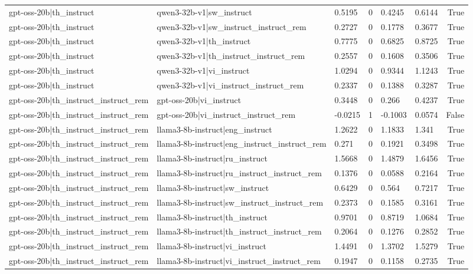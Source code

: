 \begin{table}
\begin{tabular}{llllllr}
gpt-oss-20b|th_instruct & qwen3-32b-v1|sw_instruct & 0.5195 & 0 & 0.4245 & 0.6144 & True \\
gpt-oss-20b|th_instruct & qwen3-32b-v1|sw_instruct_instruct_rem & 0.2727 & 0 & 0.1778 & 0.3677 & True \\
gpt-oss-20b|th_instruct & qwen3-32b-v1|th_instruct & 0.7775 & 0 & 0.6825 & 0.8725 & True \\
gpt-oss-20b|th_instruct & qwen3-32b-v1|th_instruct_instruct_rem & 0.2557 & 0 & 0.1608 & 0.3506 & True \\
gpt-oss-20b|th_instruct & qwen3-32b-v1|vi_instruct & 1.0294 & 0 & 0.9344 & 1.1243 & True \\
gpt-oss-20b|th_instruct & qwen3-32b-v1|vi_instruct_instruct_rem & 0.2337 & 0 & 0.1388 & 0.3287 & True \\
gpt-oss-20b|th_instruct_instruct_rem & gpt-oss-20b|vi_instruct & 0.3448 & 0 & 0.266 & 0.4237 & True \\
gpt-oss-20b|th_instruct_instruct_rem & gpt-oss-20b|vi_instruct_instruct_rem & -0.0215 & 1 & -0.1003 & 0.0574 & False \\
gpt-oss-20b|th_instruct_instruct_rem & llama3-8b-instruct|eng_instruct & 1.2622 & 0 & 1.1833 & 1.341 & True \\
gpt-oss-20b|th_instruct_instruct_rem & llama3-8b-instruct|eng_instruct_instruct_rem & 0.271 & 0 & 0.1921 & 0.3498 & True \\
gpt-oss-20b|th_instruct_instruct_rem & llama3-8b-instruct|ru_instruct & 1.5668 & 0 & 1.4879 & 1.6456 & True \\
gpt-oss-20b|th_instruct_instruct_rem & llama3-8b-instruct|ru_instruct_instruct_rem & 0.1376 & 0 & 0.0588 & 0.2164 & True \\
gpt-oss-20b|th_instruct_instruct_rem & llama3-8b-instruct|sw_instruct & 0.6429 & 0 & 0.564 & 0.7217 & True \\
gpt-oss-20b|th_instruct_instruct_rem & llama3-8b-instruct|sw_instruct_instruct_rem & 0.2373 & 0 & 0.1585 & 0.3161 & True \\
gpt-oss-20b|th_instruct_instruct_rem & llama3-8b-instruct|th_instruct & 0.9701 & 0 & 0.8719 & 1.0684 & True \\
gpt-oss-20b|th_instruct_instruct_rem & llama3-8b-instruct|th_instruct_instruct_rem & 0.2064 & 0 & 0.1276 & 0.2852 & True \\
gpt-oss-20b|th_instruct_instruct_rem & llama3-8b-instruct|vi_instruct & 1.4491 & 0 & 1.3702 & 1.5279 & True \\
gpt-oss-20b|th_instruct_instruct_rem & llama3-8b-instruct|vi_instruct_instruct_rem & 0.1947 & 0 & 0.1158 & 0.2735 & True \\

\end{tabular}
\end{table}
